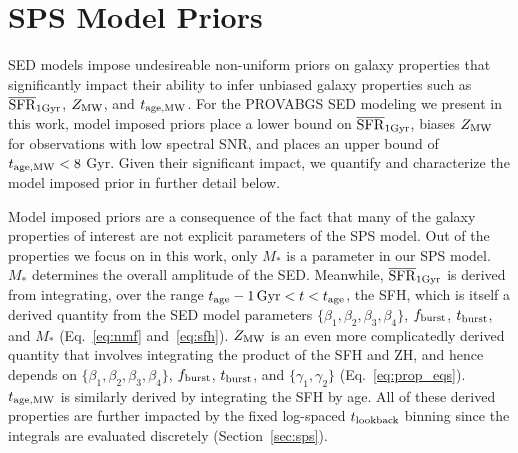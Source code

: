 \section{SPS Model Priors} \label{sec:model_priors}
SED models impose undesireable non-uniform priors on galaxy properties that
significantly impact their ability to infer unbiased galaxy properties such as
$\overline{\rm SFR}_{\rm 1Gyr}$, $Z_{\rm MW}$, and $t_{\rm age, MW}$. 
For the PROVABGS SED modeling we present in this work, model imposed priors
place a lower bound on $\overline{\rm SFR}_{\rm 1Gyr}$, biases $Z_{\rm MW}$ for observations with low
spectral SNR, and places an upper bound of $t_{\rm age, MW} < 8$ Gyr.
Given their significant impact, we quantify and characterize the model imposed
prior in further detail below. 

Model imposed priors are a consequence of the fact that many of the galaxy
properties of interest are not explicit parameters of the SPS model. 
Out of the properties we focus on in this work, only $M_*$ is a parameter in
our SPS model. 
$M_*$ determines the overall amplitude of the SED. 
Meanwhile, $\overline{\rm SFR}_{\rm 1Gyr}$ is derived from integrating, over the range 
$t_{\rm age} - 1\,{\rm Gyr} < t < t_{\rm age}$, the SFH, which is itself a
derived quantity from the SED model parameters $\{\beta_1, \beta_2, \beta_3,
\beta_4 \}$, $f_{\rm burst}$, $t_{\rm burst}$, and $M_*$ (Eq.~\ref{eq:nmf}
and~\ref{eq:sfh}).
$Z_{\rm MW}$ is an even more complicatedly derived quantity that involves integrating
the product of the SFH and ZH, and hence depends on $\{\beta_1, \beta_2,
\beta_3, \beta_4 \}$, $f_{\rm burst}$, $t_{\rm burst}$, and $\{\gamma_1,
\gamma_2\}$ (Eq.~\ref{eq:prop_eqs}).
$t_{\rm age, MW}$ is similarly derived by integrating the SFH by age. 
All of these derived properties are further impacted by the fixed log-spaced
$t_{\rm lookback}$ binning since the integrals are evaluated discretely
(Section~\ref{sec:sps}). 

